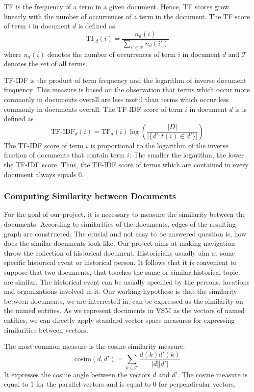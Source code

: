 TF is the frequency of a term in a given document. Hence, TF scores grow linearly with the number of occurrences of a term in the document. The TF score of term $i$ in document $d$ is defined as:
\[\text{TF}_d(i) = \frac{n_d(i)}{\sum_{i' \in \mathcal{T}}{n_d(i')}}\]
where $n_d(i)$ denotes the number of occurrences of term $i$ in document $d$ and $\mathcal{T}$ denotes the set of all terms. 

TF-IDF is the product of term frequency and the logarithm of inverse document frequency. This measure is based on the observation that terms which occur more commonly in documents overall are less useful than terms which occur less commonly in documents overall. The TF-IDF score of term $i$ in document $d$ is is defined as
\[\text{TF-IDF}_d(i)= \text{TF}_d(i)\log{\left(\frac{|D|}{|\lbrace d' : t(i) \in d' \rbrace|}\right)}\]
The TF-IDF score of term $i$ is proportional to the logarithm of the inverse fraction of documents that contain term $i$; The smaller the logarithm, the lower the TF-IDF score. Thus, the TF-IDF score of terms which are contained in every document always equals $0$.

\subsubsection{Computing Similarity between Documents}\label{sec:computing_similarity_between_documents}

For the goal of our project, it is necessary to measure the similarity between the documents. According to similarities of the documents, edges of the resulting graph are constructed. The crucial and not easy to be answered question is, how does the similar documents look like. Our project aims at making navigation throw the collection of historical document. Historicians usually aim at some specific historical event or historical person. It follows that it is convenient to suppose that two documents, that touches the same or similar historical topic, are similar. The historical event can be usually specified by the persons, locations and organizations involved in it. Our working hypothese is that the similarity between documents, we are interrested in, can be expressed as the similarity on the named entities. As we represent documents in VSM as the vectors of named entities, we can directly apply standard vector space measures for expressing similarities between vectors. 

The most common measure is the cosine similarity measure.
\[\text{cosim}(d,d') = \sum_{k \in \mathcal{T}}\frac{d(k)d'(k)}{|d||d'|}\]
It expresses the cosine angle between the vectors $d$ and $d'$. The cosine measure is equal to $1$ for the parallel vectors and is equal to $0$ for perpendicular vectors.


